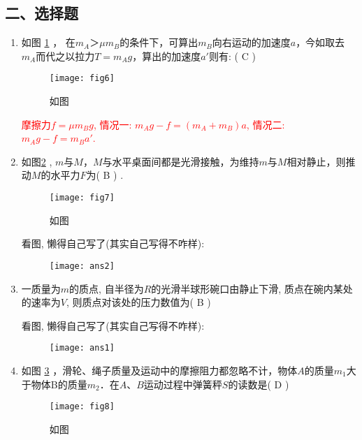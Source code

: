 \subsection*{二、选择题}
\begin{enumerate}
\item 如图 \ref{Fig:6} ， 在$m_A＞μm_B$的条件下，可算出$m_B$向右运动的加速度$a$，今如取去$m_A$而代之以拉力$T=m_Ag$，算出的加速度$a′$则有: ( C )
    \begin{figure}[h]
        \centering
        \texttt{[image: fig6]}
        \caption{如图}\label{Fig:6}
    \end{figure}
    \begin{note}
        \textcolor{red}{
        摩擦力$f = \mu m_B g$, 情况一: $m_Ag - f = (m_A + m_B)a$, 情况二: $m_Ag - f = m_B a{'}$.}
    \end{note}
\item 如图\ref{Fig:7} , $m$与$M$，$M$与水平桌面间都是光滑接触，为维持$m$与$M$相对静止，则推动$M$的水平力$F$为( B )
.
    \begin{figure}[h]
        \centering
        \texttt{[image: fig7]}
        \caption{如图}\label{Fig:7}
    \end{figure}
    \begin{note}
        看图, 懒得自己写了(其实自己写得不咋样):
    \end{note}
    \begin{figure}[H]
        \centering
        \texttt{[image: ans2]}
    \end{figure}
\item 一质量为$m$的质点, 自半径为$R$的光滑半球形碗口由静止下滑, 质点在碗内某处的速率为$V$, 则质点对该处的压力数值为( B )
\begin{note}
    看图, 懒得自己写了(其实自己写得不咋样):
\end{note}
\begin{figure}[H]
    \centering
    \texttt{[image: ans1]}
\end{figure}
\item 如图 \ref{Fig:8} ，滑轮、绳子质量及运动中的摩擦阻力都忽略不计，物体$A$的质量$m_1$大于物体B的质量$m_2$．在$A$、$B$运动过程中弹簧秤$S$的读数是( D )
    \begin{figure}[H]
        \centering
        \texttt{[image: fig8]}
        \caption{如图}\label{Fig:8}
    \end{figure}


\end{enumerate}
